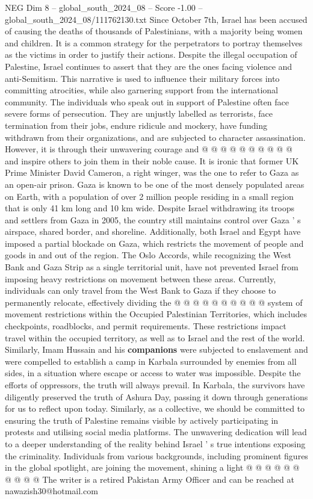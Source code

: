 \begin{textsample}{NEG Dim 8 – global\_south\_2024\_08 – Score -1.00 – global\_south\_2024\_08/111762130.txt}
Since October 7th, Israel has been accused of causing the deaths of thousands of Palestinians, with a majority being women and children.
It is a common strategy for the perpetrators to portray themselves as the victims in order to justify their actions.
Despite the illegal occupation of Palestine, Israel continues to assert that they are the ones facing violence and anti-Semitism.
This narrative is used to influence their military forces into committing atrocities, while also garnering support from the international community.
The individuals who speak out in support of Palestine often face severe forms of persecution.
They are unjustly labelled as terrorists, face termination from their jobs, endure ridicule and mockery, have funding withdrawn from their organizations, and are subjected to character assassination.
However, it is through their unwavering courage and @ @ @ @ @ @ @ @ @ @ and inspire others to join them in their noble cause.
It is ironic that former UK Prime Minister David Cameron, a right winger, was the one to refer to Gaza as an open-air prison.
Gaza is known to be one of the most densely populated areas on Earth, with a population of over 2 million people residing in a small region that is only 41 km long and 10 km wide.
Despite Israel withdrawing its troops and settlers from Gaza in 2005, the country still maintains control over Gaza ' s airspace, shared border, and shoreline.
Additionally, both Israel and Egypt have imposed a partial blockade on Gaza, which restricts the movement of people and goods in and out of the region.
The Oslo Accords, while recognizing the West Bank and Gaza Strip as a single territorial unit, have not prevented Israel from imposing heavy restrictions on movement between these areas.
Currently, individuals can only travel from the West Bank to Gaza if they choose to permanently relocate, effectively dividing the @ @ @ @ @ @ @ @ @ @ system of movement restrictions within the Occupied Palestinian Territories, which includes checkpoints, roadblocks, and permit requirements.
These restrictions impact travel within the occupied territory, as well as to Israel and the rest of the world.
Similarly, Imam Hussain and his \textbf{companions} were subjected to enslavement and were compelled to establish a camp in Karbala surrounded by enemies from all sides, in a situation where escape or access to water was impossible.
Despite the efforts of oppressors, the truth will always prevail.
In Karbala, the survivors have diligently preserved the truth of Ashura Day, passing it down through generations for us to reflect upon today.
Similarly, as a collective, we should be committed to ensuring the truth of Palestine remains visible by actively participating in protests and utilising social media platforms.
The unwavering dedication will lead to a deeper understanding of the reality behind Israel ' s true intentions exposing the criminality.
Individuals from various backgrounds, including prominent figures in the global spotlight, are joining the movement, shining a light @ @ @ @ @ @ @ @ @ @ The writer is a retired Pakistan Army Officer and can be reached at nawazish30@hotmail.com

\end{textsample}
